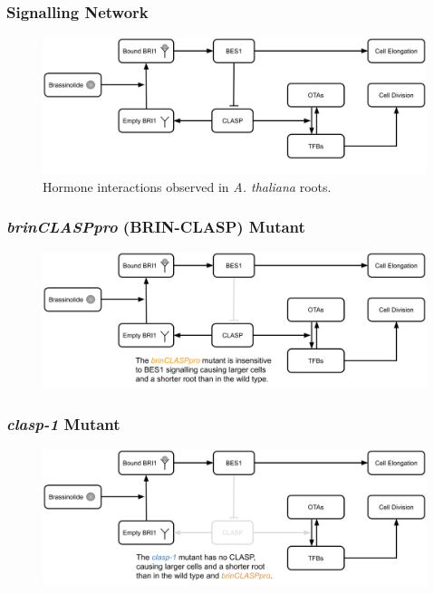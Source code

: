 \documentclass{beamer}
\begin{document}
\begin{frame}
\frametitle{Signalling Network}
\begin{figure}
  \centering
  \includegraphics[width=\textwidth]{network-wild-type.png}
  \caption{Hormone interactions observed in \emph{A. thaliana} roots.}
\end{figure}
\end{frame}

\begin{frame}
\frametitle{\emph{brinCLASPpro} (BRIN-CLASP) Mutant}
\begin{figure}
  \centering
  \includegraphics[width=\textwidth]{network-brin-clasp.png}
\end{figure}
\end{frame}

\begin{frame}
\frametitle{\emph{clasp-1} Mutant}
\begin{figure}
  \centering
  \includegraphics[width=\textwidth]{network-clasp-1.png}
\end{figure}
\end{frame}
\end{document}

